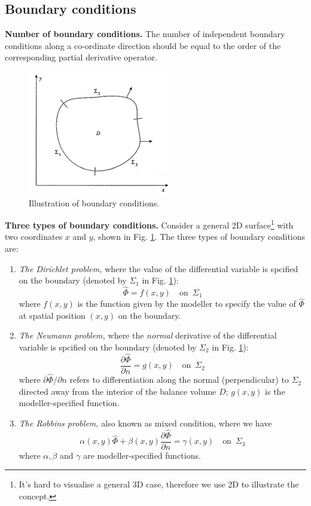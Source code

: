 \documentclass[a4paper,11pt]{article}
\theoremstyle{definition}
\begin{document}
\subsection*{Boundary conditions}

\textbf{Number of boundary conditions.} The number of independent boundary conditions along a co-ordinate 
direction should be equal to the order of the corresponding partial derivative operator.

\begin{figure} [!h]
 \begin{center}
	\includegraphics[width=.35\textwidth]{bdy}
 \end{center}
 \caption{Illustration of boundary conditions.}
 \label{fig:bdy}
\end{figure}

\textbf{Three types of boundary conditions.} Consider a general 2D surface\footnote{It's hard to visualise
a general 3D case, therefore we use 2D to illustrate the concept.} with two coordinates $x$ and $y$,
shown in Fig. \ref{fig:bdy}. The three types of boundary conditions are:
\begin{enumerate}
	\item \emph{The Dirichlet problem,} where the value of the differential variable
		is spcified on the boundary (denoted by $\Sigma_1$ in Fig. \ref{fig:bdy}):
		\[ \hat{\Phi} = f (x, y) \quad \textrm{on } \, \Sigma_1 \]
		\noindent where $f(x, y)$ is the function given by the modeller to specify the
		value of $\hat{\Phi}$ at spatial position $(x, y)$ on the boundary.
	\item \emph{The Neumann problem,} where the \emph{normal} derivative of the differential variable
		is spcified on the boundary (denoted by $\Sigma_2$ in Fig. \ref{fig:bdy}):
		\[ \frac{\partial \hat{\Phi}}{\partial n} = g(x, y) \quad \textrm{on } \, \Sigma_2 \]
		\noindent where $\partial \hat{\Phi} / \partial n$ refers to differentiation along the normal
		(perpendicular) to $\Sigma_2$ directed away from the interior of the balance volume $D$;
		$g(x, y)$ is the modeller-specified function.
	\item \emph{The Robbins problem,} also known as mixed condition, where we have
		\[ \alpha(x, y) \hat{\Phi} + \beta(x, y) \frac{\partial \hat{\Phi}}{\partial n} = \gamma (x, y) \quad \textrm{on } \, \Sigma_3 \]
		\noindent where $\alpha, \beta$ and $\gamma$ are modeller-specified functions.
\end{enumerate}
\end{document}
